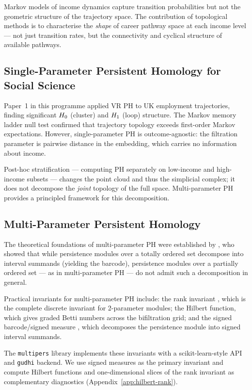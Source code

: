 Markov models of income dynamics \citep{cappellari2004modelling} capture
transition probabilities but not the geometric structure of the trajectory
space. The contribution of topological methods is to characterise the
\emph{shape} of career pathway space at each income level --- not just
transition rates, but the connectivity and cyclical structure of available
pathways.

\subsection{Single-Parameter Persistent Homology for Social Science}

Paper~1 in this programme applied VR PH to UK employment trajectories,
finding significant $H_{0}$ (cluster) and $H_{1}$ (loop) structure. The
Markov memory ladder null test confirmed that trajectory topology exceeds
first-order Markov expectations. However, single-parameter PH is
outcome-agnostic: the filtration parameter is pairwise distance in the
embedding, which carries no information about income.

Post-hoc stratification --- computing PH separately on low-income and
high-income subsets --- changes the point cloud and thus the simplicial
complex; it does not decompose the \emph{joint} topology of the full space.
Multi-parameter PH provides a principled framework for this decomposition.

\subsection{Multi-Parameter Persistent Homology}

The theoretical foundations of multi-parameter PH were established by
\citet{carlsson2009theory}, who showed that while persistence modules over a
totally ordered set decompose into interval summands (yielding the barcode),
persistence modules over a partially ordered set --- as in multi-parameter
PH --- do not admit such a decomposition in general.

Practical invariants for multi-parameter PH include: the rank invariant
\citep{carlsson2009theory}, which is the complete discrete invariant for
2-parameter modules; the Hilbert function, which gives graded Betti numbers
across the bifiltration grid; and the signed barcode/signed measure
\citep{botnan2022signed, loiseaux2023framework}, which decomposes the
persistence module into signed interval summands.

The \texttt{multipers} library \citep{loiseaux2024multipers} implements these
invariants with a scikit-learn-style API and \texttt{gudhi} backend. We use
signed measures as the primary invariant and compute Hilbert functions and
one-dimensional slices of the rank invariant as complementary diagnostics
(Appendix~\ref{app:hilbert-rank}).

